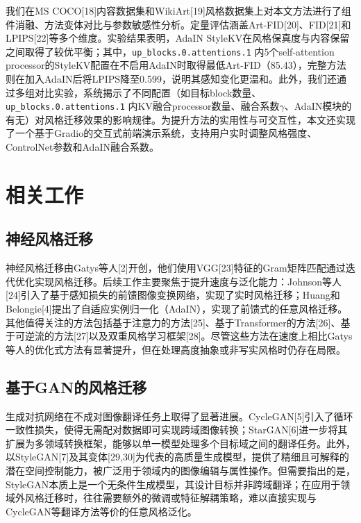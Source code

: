 \documentclass[10pt,twocolumn]{article}
\begin{document}
我们在MS COCO[18]内容数据集和WikiArt[19]风格数据集上对本文方法进行了组件消融、方法变体对比与参数敏感性分析。定量评估涵盖Art-FID[20]、FID[21]和LPIPS[22]等多个维度。实验结果表明，AdaIN StyleKV在风格保真度与内容保留之间取得了较优平衡；其中，\texttt{up\_blocks.0.attentions.1} 内5个self-attention processor的StyleKV配置在不启用AdaIN时取得最低Art-FID（85.43），完整方法则在加入AdaIN后将LPIPS降至0.599，说明其感知变化更温和。此外，我们还通过多组对比实验，系统揭示了不同配置（如目标block数量、\texttt{up\_blocks.0.attentions.1} 内KV融合processor数量、融合系数$\gamma$、AdaIN模块的有无）对风格迁移效果的影响规律。为提升方法的实用性与可交互性，本文还实现了一个基于Gradio的交互式前端演示系统，支持用户实时调整风格强度、ControlNet参数和AdaIN融合系数。

\section{相关工作}

\subsection{神经风格迁移}

神经风格迁移由Gatys等人[2]开创，他们使用VGG[23]特征的Gram矩阵匹配通过迭代优化实现风格迁移。后续工作主要聚焦于提升速度与泛化能力：Johnson等人[24]引入了基于感知损失的前馈图像变换网络，实现了实时风格迁移；Huang和Belongie[4]提出了自适应实例归一化（AdaIN），实现了前馈式的任意风格迁移。其他值得关注的方法包括基于注意力的方法[25]、基于Transformer的方法[26]、基于可逆流的方法[27]以及双重风格学习框架[28]。尽管这些方法在速度上相比Gatys等人的优化式方法有显著提升，但在处理高度抽象或非写实风格时仍存在局限。

\subsection{基于GAN的风格迁移}

生成对抗网络在不成对图像翻译任务上取得了显著进展。CycleGAN[5]引入了循环一致性损失，使得无需配对数据即可实现跨域图像转换；StarGAN[6]进一步将其扩展为多领域转换框架，能够以单一模型处理多个目标域之间的翻译任务。此外，以StyleGAN[7]及其变体[29,30]为代表的高质量生成模型，提供了精细且可解释的潜在空间控制能力，被广泛用于领域内的图像编辑与属性操作。但需要指出的是，StyleGAN本质上是一个无条件生成模型，其设计目标并非跨域翻译；在应用于领域外风格迁移时，往往需要额外的微调或特征解耦策略，难以直接实现与CycleGAN等翻译方法等价的任意风格泛化。
\end{document}
